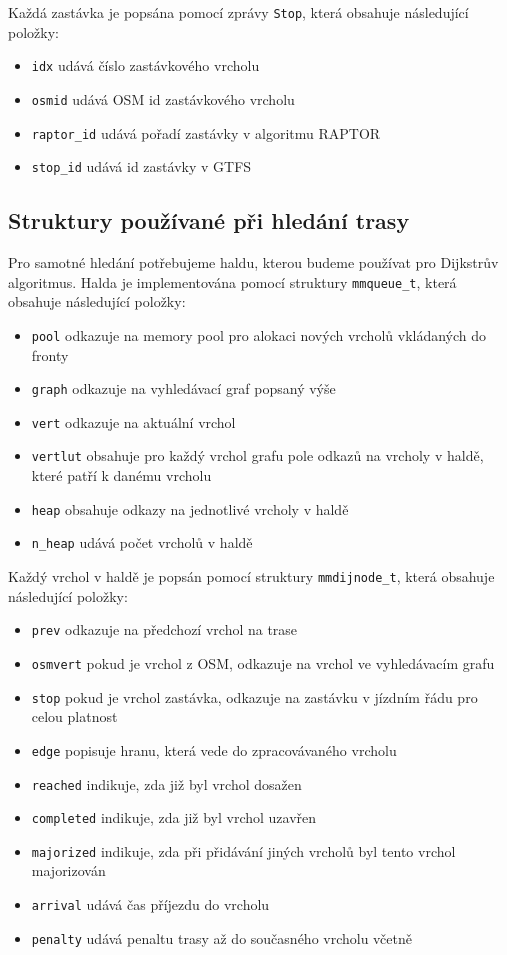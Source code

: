 Každá zastávka je popsána pomocí zprávy {\tt Stop}, která obsahuje následující
položky:
\begin{itemize}
	\item {\tt idx} udává číslo zastávkového vrcholu
	\item {\tt osmid} udává OSM id zastávkového vrcholu 
	\item {\tt raptor\_id} udává pořadí zastávky v algoritmu RAPTOR
	\item {\tt stop\_id} udává id zastávky v GTFS
\end{itemize} 

\subsection{Struktury používané při hledání trasy}
Pro samotné hledání potřebujeme haldu, kterou budeme používat pro Dijkstrův
algoritmus. Halda je implementována pomocí struktury {\tt mmqueue\_t}, která
obsahuje následující položky:
\begin{itemize}
	\item {\tt pool} odkazuje na memory pool pro alokaci nových vrcholů
	vkládaných do fronty 
	\item {\tt graph} odkazuje na vyhledávací graf popsaný výše
	\item {\tt vert} odkazuje na aktuální vrchol 
	\item {\tt vertlut} obsahuje pro každý vrchol grafu pole odkazů na
	vrcholy v haldě, které patří k danému vrcholu
	\item {\tt heap} obsahuje odkazy na jednotlivé vrcholy v haldě
	\item {\tt n\_heap} udává počet vrcholů v haldě
\end{itemize}
Každý vrchol v haldě je popsán pomocí struktury {\tt mmdijnode\_t}, která
obsahuje následující položky:
\begin{itemize}
	\item {\tt prev} odkazuje na předchozí vrchol na trase
	\item {\tt osmvert} pokud je vrchol z OSM, odkazuje na vrchol ve
	vyhledávacím grafu 
	\item {\tt stop} pokud je vrchol zastávka, odkazuje na zastávku v
	jízdním řádu pro celou platnost
	\item {\tt edge} popisuje hranu, která vede do zpracovávaného vrcholu 
	\item {\tt reached} indikuje, zda již byl vrchol dosažen
	\item {\tt completed} indikuje, zda již byl vrchol uzavřen
	\item {\tt majorized} indikuje, zda při přidávání jiných vrcholů byl
	tento vrchol majorizován
	\item {\tt arrival} udává čas příjezdu do vrcholu
	\item {\tt penalty} udává penaltu trasy až do současného vrcholu včetně
\end{itemize}
